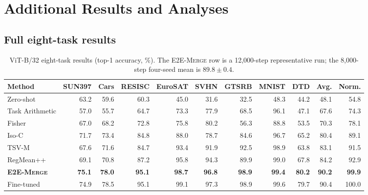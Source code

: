 \documentclass[letterpaper]{article} %
\newcommand{\method}{\textup{\textsc{E2E-Merge}}\xspace}
\theoremstyle{plain}
\theoremstyle{definition}
\begin{document}
\section{Additional Results and Analyses}
\label{app:additional-results}

\subsection{Full eight-task results}
\label{app:full-results}

\begin{table}[tb]
\centering
{\small
\begin{tabular*}{\textwidth}{@{\extracolsep{\fill}}lrrrrrrrrrr}
\toprule
Method & SUN397 & Cars & RESISC & EuroSAT & SVHN & GTSRB & MNIST & DTD & Avg. & Norm. \\
\midrule
Zero-shot & 63.2 & 59.6 & 60.3 & 45.0 & 31.6 & 32.5 & 48.3 & 44.2 & 48.1 & 54.8 \\
Task Arithmetic & 57.0 & 55.7 & 64.7 & 73.3 & 77.9 & 68.5 & 96.1 & 47.1 & 67.6 & 74.3 \\
Fisher & 67.0 & 68.2 & 72.8 & 75.8 & 80.2 & 56.3 & 88.8 & 53.5 & 70.3 & 78.1 \\
Iso-C & 71.7 & 73.4 & 84.8 & 88.0 & 78.7 & 84.6 & 96.7 & 65.2 & 80.4 & 89.1 \\
TSV-M & 67.6 & 71.6 & 84.7 & 93.4 & 91.9 & 92.5 & 98.9 & 63.8 & 83.1 & 91.5 \\
RegMean++ & 69.1 & 70.8 & 87.2 & 95.8 & 94.3 & 89.9 & 99.0 & 67.8 & 84.2 & 92.9 \\
\textbf{\method} & \textbf{75.1} & \textbf{78.0} & \textbf{95.1} & \textbf{98.7} & \textbf{96.8} & \textbf{98.9} & \textbf{99.4} & \textbf{80.2} & \textbf{90.2} & \textbf{99.9} \\
\midrule
Fine-tuned & 74.9 & 78.5 & 95.1 & 99.1 & 97.3 & 98.9 & 99.6 & 79.7 & 90.4 & 100.0 \\
\bottomrule
\end{tabular*}
}
\caption{ViT-B/32 eight-task results (top-1 accuracy, \%). The \method row is a
12,000-step representative run; the 8,000-step four-seed mean is $89.8\pm0.4$.}
\label{tab:b32-main}
\end{table}
\end{document}
